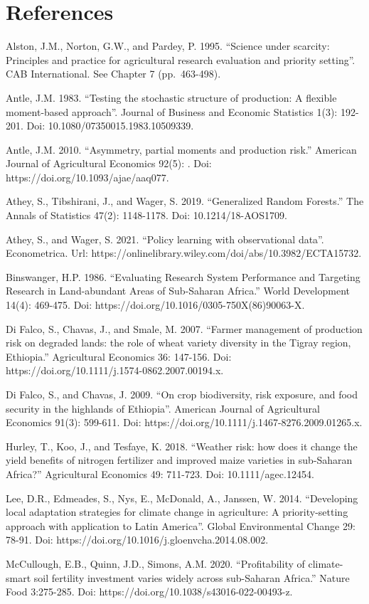 \documentclass[
  letterpaper,
  DIV=11,
  numbers=noendperiod]{scrreprt}
\begin{document}

\chapter{References}\label{references}

Alston, J.M., Norton, G.W., and Pardey, P. 1995. ``Science under
scarcity: Principles and practice for agricultural research evaluation
and priority setting''. CAB International. See Chapter 7 (pp.~463-498).

Antle, J.M. 1983. ``Testing the stochastic structure of production: A
flexible moment-based approach''. Journal of Business and Economic
Statistics 1(3): 192-201. Doi: 10.1080/07350015.1983.10509339.

Antle, J.M. 2010. ``Asymmetry, partial moments and production risk.''
American Journal of Agricultural Economics 92(5): . Doi:
https://doi.org/10.1093/ajae/aaq077.

Athey, S., Tibshirani, J., and Wager, S. 2019. ``Generalized Random
Forests.'' The Annals of Statistics 47(2): 1148-1178. Doi:
10.1214/18-AOS1709.

Athey, S., and Wager, S. 2021. ``Policy learning with observational
data''. Econometrica. Url:
https://onlinelibrary.wiley.com/doi/abs/10.3982/ECTA15732.

Binswanger, H.P. 1986. ``Evaluating Research System Performance and
Targeting Research in Land-abundant Areas of Sub-Saharan Africa.'' World
Development 14(4): 469-475. Doi:
https://doi.org/10.1016/0305-750X(86)90063-X.

Di Falco, S., Chavas, J., and Smale, M. 2007. ``Farmer management of
production risk on degraded lands: the role of wheat variety diversity
in the Tigray region, Ethiopia.'' Agricultural Economics 36: 147-156.
Doi: https://doi.org/10.1111/j.1574-0862.2007.00194.x.

Di Falco, S., and Chavas, J. 2009. ``On crop biodiversity, risk
exposure, and food security in the highlands of Ethiopia''. American
Journal of Agricultural Economics 91(3): 599-611. Doi:
https://doi.org/10.1111/j.1467-8276.2009.01265.x.

Hurley, T., Koo, J., and Tesfaye, K. 2018. ``Weather risk: how does it
change the yield benefits of nitrogen fertilizer and improved maize
varieties in sub-Saharan Africa?'' Agricultural Economics 49: 711-723.
Doi: 10.1111/agec.12454.

Lee, D.R., Edmeades, S., Nys, E., McDonald, A., Janssen, W. 2014.
``Developing local adaptation strategies for climate change in
agriculture: A priority-setting approach with application to Latin
America''. Global Environmental Change 29: 78-91. Doi:
https://doi.org/10.1016/j.gloenvcha.2014.08.002.

McCullough, E.B., Quinn, J.D., Simons, A.M. 2020. ``Profitability of
climate-smart soil fertility investment varies widely across sub-Saharan
Africa.'' Nature Food 3:275-285. Doi:
https://doi.org/10.1038/s43016-022-00493-z.
\end{document}
